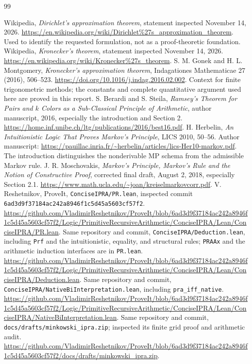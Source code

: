 \documentclass[11pt]{article}
\theoremstyle{definition}\newtheorem{definition}[theorem]{Definition}
\theoremstyle{remark}\newtheorem{remark}[theorem]{Remark}
\begin{document}
\begin{thebibliography}{99}
\raggedright
{} Wikipedia, \emph{Dirichlet's approximation theorem}, statement inspected November 14, 2026. \url{https://en.wikipedia.org/wiki/Dirichlet%27s_approximation_theorem}. Used to identify the requested formulation, not as a proof-theoretic foundation.
 Wikipedia, \emph{Kronecker's theorem}, statement inspected November 14, 2026. \url{https://en.wikipedia.org/wiki/Kronecker%27s_theorem}.
 S. M. Gonek and H. L. Montgomery, \emph{Kronecker's approximation theorem}, Indagationes Mathematicae 27 (2016), 506--523. \url{https://doi.org/10.1016/j.indag.2016.02.002}. Context for finite trigonometric methods; the constants and complete quantitative argument used here are proved in this report.
 S. Berardi and S. Steila, \emph{Ramsey's Theorem for Pairs and $k$ Colors as a Sub-Classical Principle of Arithmetic}, author manuscript, 2016, especially the introduction and Section 2. \url{https://home.inf.unibe.ch/ltg/publications/2016/best16.pdf}.
 H. Herbelin, \emph{An Intuitionistic Logic That Proves Markov's Principle}, LICS 2010, 50--56. Author manuscript: \url{https://pauillac.inria.fr/~herbelin/articles/lics-Her10-markov.pdf}. The introduction distinguishes the nonderivable MP schema from the admissible Markov rule.
 J. R. Moschovakis, \emph{Markov's Principle, Markov's Rule and the Notion of Constructive Proof}, corrected final draft, August 2, 2018, especially Section 2.1. \url{https://www.math.ucla.edu/~joan/kreiselmarkovcorr.pdf}.
 V. Reshetnikov, ProveIt, \texttt{ConciseIPRA/PR.lean}, inspected commit \texttt{6ad3d9f37184ac242a8946f1c5d45a5603cf57f2}. \url{https://github.com/VladimirReshetnikov/ProveIt/blob/6ad3d9f37184ac242a8946f1c5d45a5603cf57f2/Logic/PrimitiveRecursiveArithmetic/ConciseIPRA/Lean/ConciseIPRA/PR.lean}.
 Same repository and commit, \texttt{ConciseIPRA/Deduction.lean}, including \texttt{Prf} and the intuitionistic, equality, and structural rules; \texttt{PRAAx} and the arithmetic induction interfaces are in \texttt{PR.lean}. \url{https://github.com/VladimirReshetnikov/ProveIt/blob/6ad3d9f37184ac242a8946f1c5d45a5603cf57f2/Logic/PrimitiveRecursiveArithmetic/ConciseIPRA/Lean/ConciseIPRA/Deduction.lean}.
 Same repository and commit, \texttt{ConciseIPRA/NativeBiInterpretation.lean}, including \texttt{pra\_iff\_native}. \url{https://github.com/VladimirReshetnikov/ProveIt/blob/6ad3d9f37184ac242a8946f1c5d45a5603cf57f2/Logic/PrimitiveRecursiveArithmetic/ConciseIPRA/Lean/ConciseIPRA/NativeBiInterpretation.lean}.
 Same repository and commit, \texttt{docs/drafts/minkowski\_ipra.zip}; inspected its finite grid proof and arithmetic audit. \url{https://github.com/VladimirReshetnikov/ProveIt/blob/6ad3d9f37184ac242a8946f1c5d45a5603cf57f2/docs/drafts/minkowski_ipra.zip}.
\end{thebibliography}
\end{document}
